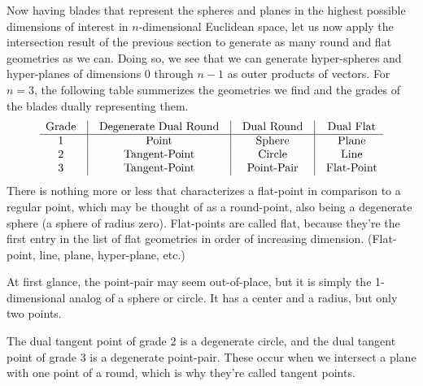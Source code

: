 \documentclass[12pt]{article}
\begin{document}
Now having blades that represent the spheres and planes in the highest possible
dimensions of interest in $n$-dimensional Euclidean space, let us now apply
the intersection result of the previous section to generate as many round
and flat geometries as we can.  Doing so, we see that we can generate
hyper-spheres and hyper-planes of dimensions $0$ through $n-1$ as
outer products of vectors.  For $n=3$, the following table summerizes
the geometries we find and the grades of the blades dually representing them.
\begin{equation*}
\begin{array}{ccccccc}
\mbox{Grade} & \vline & \mbox{Degenerate Dual Round} & \vline & \mbox{Dual Round} & \vline & \mbox{Dual Flat} \\
\hline
1 & \vline & \mbox{Point} & \vline & \mbox{Sphere} & \vline & \mbox{Plane} \\
2 & \vline & \mbox{Tangent-Point} & \vline & \mbox{Circle} & \vline & \mbox{Line} \\
3 & \vline & \mbox{Tangent-Point} & \vline & \mbox{Point-Pair} & \vline & \mbox{Flat-Point}
\end{array}
\end{equation*}
There is nothing more or less that characterizes a flat-point in comparison
to a regular point, which may be thought of as a round-point, also being
a degenerate sphere (a sphere of radius zero).  Flat-points are called flat,
because they're the first entry in the list of flat geometries in order of
increasing dimension.  (Flat-point, line, plane, hyper-plane, etc.)

At first glance, the point-pair may seem out-of-place, but it is simply
the 1-dimensional analog of a sphere or circle.  It has a center and
a radius, but only two points.

The dual tangent point of grade 2 is a degenerate
circle, and the dual tangent point of grade 3 is a degenerate point-pair.
These occur when we intersect a plane with one point of a round,
which is why they're called tangent points.
\end{document}
